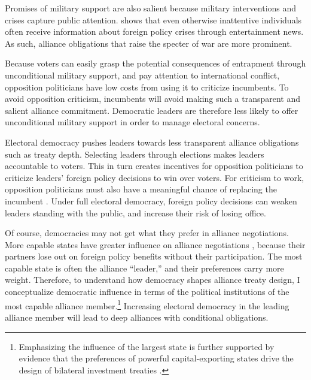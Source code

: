 \documentclass[12pt]{article}
\begin{document}
Promises of military support are also salient because military interventions and crises capture public attention. 
\citet{Baum2002} shows that even otherwise inattentive individuals often receive information about foreign policy crises through entertainment news. 
As such, alliance obligations that raise the specter of war are more prominent. 


Because voters can easily grasp the potential consequences of entrapment through unconditional military support, and pay attention to international conflict, opposition politicians have low costs from using it to criticize incumbents. 
To avoid opposition criticism, incumbents will avoid making such a transparent and salient alliance commitment.
Democratic leaders are therefore less likely to offer unconditional military support in order to manage electoral concerns. 


Electoral democracy pushes leaders towards less transparent alliance obligations such as treaty depth.
Selecting leaders through elections makes leaders accountable to voters. 
This in turn creates incentives for opposition politicians to criticize leaders' foreign policy decisions to win over voters. 
For criticism to work, opposition politicians must also have a meaningful chance of replacing the incumbent \citep{HydeMarinov2012}.
Under full electoral democracy, foreign policy decisions can weaken leaders standing with the public, and increase their risk of losing office.


Of course, democracies may not get what they prefer in alliance negotiations. 
More capable states have greater influence on alliance negotiations \citep{Mattes2012}, because their partners lose out on foreign policy benefits without their participation.
The most capable state is often the alliance ``leader,'' and their preferences carry more weight. 
Therefore, to understand how democracy shapes alliance treaty design, I conceptualize democratic influence in terms of the political institutions of the most capable alliance member.\footnote{Emphasizing the influence of the largest state is further supported by evidence that the preferences of powerful capital-exporting states drive the design of bilateral investment treaties \citep{AlleePeinhardt2014}.} 
Increasing electoral democracy in the leading alliance member will lead to deep alliances with conditional obligations. 
\end{document}
